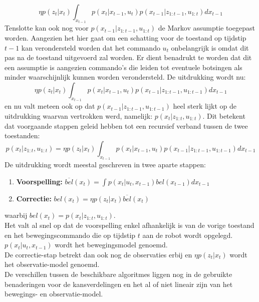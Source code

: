 \begin{equation*}
\eta p(z_t|x_t)\int_{x_{t-1}}p(x_t|x_{t-1},u_{t})p(x_{t-1}|z_{1:t-1},u_{1:t})dx_{t-1}
\end{equation*}
Tenslotte kan ook nog voor $p(x_{t-1}|z_{1:t-1},u_{1:t})$ de Markov assumptie toegepast worden. Aangezien het hier gaat om een schatting voor de toestand op tijdstip $t-1$ kan verondersteld worden dat het commando $u_t$ onbelangrijk is omdat dit pas na de toestand uitgevoerd zal worden. Er dient benadrukt te worden dat dit een assumptie is aangezien commando's die leiden tot eventuele botsingen als minder waarschijnlijk kunnen worden verondersteld. De uitdrukking wordt nu:
\begin{equation*}
\eta p(z_t|x_t)\int_{x_{t-1}}p(x_t|x_{t-1},u_{t})p(x_{t-1}|z_{1:t-1},u_{1:t-1})dx_{t-1}
\end{equation*}
en nu valt meteen ook op dat $p(x_{t-1}|z_{1:t-1},u_{1:t-1})$ heel sterk lijkt op de uitdrukking waarvan vertrokken werd, namelijk: $p(x_t|z_{1:t},u_{1:t})$. Dit betekent dat voorgaande stappen geleid hebben tot een recursief verband tussen de twee toestanden:
\begin{equation*}
p(x_t|z_{1:t},u_{1:t})=\eta p(z_t|x_t)\int_{x_{t-1}}p(x_t|x_{t-1},u_{t})p(x_{t-1}|z_{1:t-1},u_{1:t-1})dx_{t-1}
\end{equation*}
De uitdrukking wordt meestal geschreven in twee aparte stappen:
\begin{enumerate}
	\item \textbf{Voorspelling: }$\overline{bel}(x_t) = \int p(x_t|u_t,x_{t-1})bel(x_{t-1})dx_{t-1}$
	\item \textbf{Correctie: } $bel(x_t) = \eta p(z_t|x_t)\overline{bel}(x_t)$
\end{enumerate}
waarbij $bel(x_t) = p(x_t|z_{1:t},u_{1:t})$.\\
Het valt al snel op dat de voorspelling enkel afhankelijk is van de vorige toestand en het bewegingscommando die op tijdstip $t$ aan de robot wordt opgelegd. $p(x_t|u_t,x_{t-1})$ wordt het bewegingsmodel genoemd.\\
De correctie-stap betrekt dan ook nog de observaties erbij en $\eta p(z_t|x_t)$ wordt het observatie-model genoemd.\\
De verschillen tussen de beschikbare algoritmes liggen nog in de gebruikte benaderingen voor de kansverdelingen en het al of niet lineair zijn van het bewegings- en observatie-model.

